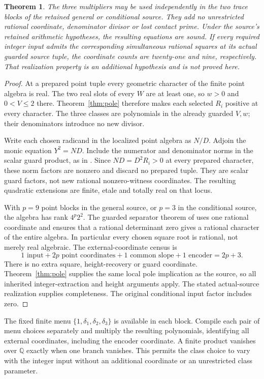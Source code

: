 \documentclass[11pt,a4paper]{article}
\newtheorem{theorem}{Theorem}[section]
\newcommand{\Q}{\mathbb Q}\newcommand{\Z}{\mathbb Z}
\begin{document}
\begin{theorem}\label{thm:encoding}
The three multipliers may be used independently in the two trace
blocks of the retained general or conditional source. They add no
unrestricted rational coordinate, denominator divisor or lost
contact prime. Under the source's retained arithmetic hypotheses,
the resulting equations are sound. If every required integer input
admits the corresponding simultaneous rational squares at its actual
guarded source tuple, the coordinate counts are twenty-one and nine,
respectively. That realization property is an additional hypothesis
and is not proved here.
\end{theorem}
\begin{proof}
At a prepared point tuple every geometric character of the finite
point algebra is real. The two real slots of every $W$ are at least
one, so $w>0$ and $0<V\le2$ there. Theorem~\ref{thm:pole}
therefore makes each selected $R_i$ positive at every character.
The three classes are polynomials in the already guarded $V,w$;
their denominators introduce no new divisor.

Write each chosen radicand in the localized point algebra as $N/D$.
Adjoin the monic equation $Y^2=ND$. Include the numerator and
denominator norms in the scalar guard product, as in \cite{Unit}.
Since $ND=D^2R_i>0$ at every prepared character, these norm factors
are nonzero and discard no prepared tuple. They are scalar guard
factors, not new rational nonzero-witness coordinates. The resulting
quadratic extensions are finite, etale and totally real on that locus.

With $p=9$ point blocks in the general source, or $p=3$ in the
conditional source, the algebra has rank $4^p2^2$. The guarded
separator theorem of \cite{Unit} uses one rational coordinate and
ensures that a rational determinant zero gives a rational character
of the entire algebra. In particular every chosen square root is
rational, not merely real algebraic. The external-coordinate census is
\[
 1\text{ input}+2p\text{ point coordinates}
          +1\text{ common slope}+1\text{ encoder}=2p+3.
\]
There is no extra square, height-recovery or guard coordinate.
Theorem~\ref{thm:pole} supplies the same local pole implication as
the source, so all inherited integer-extraction and height arguments
apply. The stated actual-source realization supplies completeness.
The original conditional input factor includes zero.
\end{proof}

The fixed finite menu $\{1,\delta_1,\delta_2,\delta_3\}$ is
available in each block. Compile each pair of menu choices separately
and multiply the resulting polynomials, identifying all external
coordinates, including the encoder coordinate. A finite product
vanishes over $\Q$ exactly when one branch vanishes. This permits
the class choice to vary with the integer input without an additional
coordinate or an unrestricted class parameter.
\end{document}
